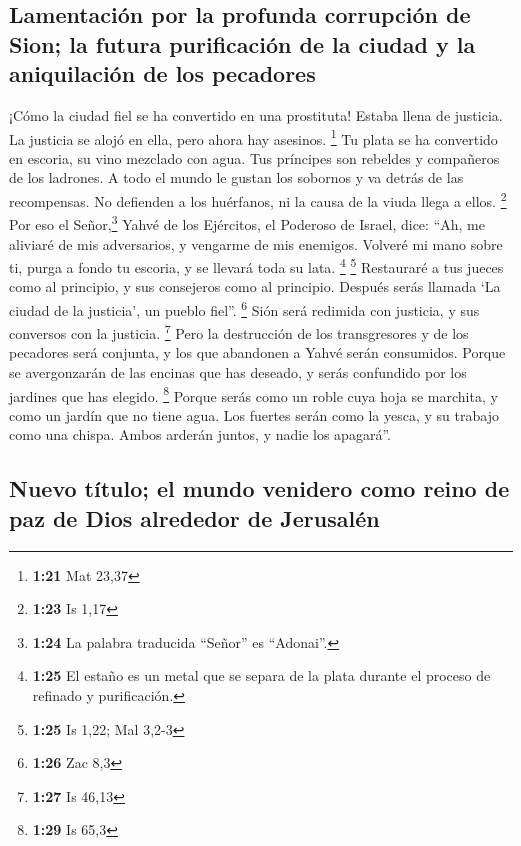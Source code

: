 \hypertarget{lamentaciuxf3n-por-la-profunda-corrupciuxf3n-de-sion-la-futura-purificaciuxf3n-de-la-ciudad-y-la-aniquilaciuxf3n-de-los-pecadores}{%
\subsection{Lamentación por la profunda corrupción de Sion; la futura
purificación de la ciudad y la aniquilación de los
pecadores}\label{lamentaciuxf3n-por-la-profunda-corrupciuxf3n-de-sion-la-futura-purificaciuxf3n-de-la-ciudad-y-la-aniquilaciuxf3n-de-los-pecadores}}

 ¡Cómo la ciudad fiel se ha convertido en una prostituta!
Estaba llena de justicia. La justicia se alojó en ella, pero ahora hay
asesinos. \footnote{\textbf{1:21} Mat 23,37}  Tu plata se
ha convertido en escoria, su vino mezclado con agua.  Tus
príncipes son rebeldes y compañeros de los ladrones. A todo el mundo le
gustan los sobornos y va detrás de las recompensas. No defienden a los
huérfanos, ni la causa de la viuda llega a ellos. \footnote{\textbf{1:23}
  Is 1,17}  Por eso el Señor,\footnote{\textbf{1:24} La
  palabra traducida ``Señor'' es ``Adonai''.} Yahvé de los Ejércitos, el
Poderoso de Israel, dice: ``Ah, me aliviaré de mis adversarios, y
vengarme de mis enemigos.  Volveré mi mano sobre ti,
purga a fondo tu escoria, y se llevará toda su lata. \footnote{\textbf{1:25}
  El estaño es un metal que se separa de la plata durante el proceso de
  refinado y purificación.} \footnote{\textbf{1:25} Is 1,22; Mal 3,2-3}
 Restauraré a tus jueces como al principio, y sus
consejeros como al principio. Después serás llamada `La ciudad de la
justicia', un pueblo fiel''. \footnote{\textbf{1:26} Zac 8,3}
 Sión será redimida con justicia, y sus conversos con la
justicia. \footnote{\textbf{1:27} Is 46,13}  Pero la
destrucción de los transgresores y de los pecadores será conjunta, y los
que abandonen a Yahvé serán consumidos.  Porque se
avergonzarán de las encinas que has deseado, y serás confundido por los
jardines que has elegido. \footnote{\textbf{1:29} Is 65,3}
 Porque serás como un roble cuya hoja se marchita, y como
un jardín que no tiene agua.  Los fuertes serán como la
yesca, y su trabajo como una chispa. Ambos arderán juntos, y nadie los
apagará''.

\hypertarget{nuevo-tuxedtulo-el-mundo-venidero-como-reino-de-paz-de-dios-alrededor-de-jerusaluxe9n}{%
\subsection{Nuevo título; el mundo venidero como reino de paz de Dios
alrededor de
Jerusalén}\label{nuevo-tuxedtulo-el-mundo-venidero-como-reino-de-paz-de-dios-alrededor-de-jerusaluxe9n}}

